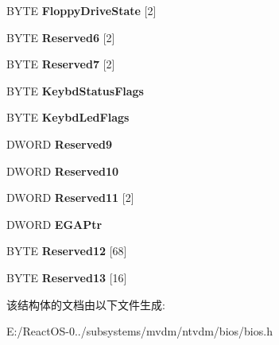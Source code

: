 \begin{DoxyCompactItemize}
B\+Y\+TE {\bfseries Floppy\+Drive\+State} \mbox{[}2\mbox{]}
\item 
\mbox{\label{struct_b_i_o_s___d_a_t_a___a_r_e_a_a6ed4ef6820f5293dbe5fb17b776a8fae}} 
B\+Y\+TE {\bfseries Reserved6} \mbox{[}2\mbox{]}
\item 
\mbox{\label{struct_b_i_o_s___d_a_t_a___a_r_e_a_ad7636bc385d8c009934668ee2b5337d9}} 
B\+Y\+TE {\bfseries Reserved7} \mbox{[}2\mbox{]}
\item 
\mbox{\label{struct_b_i_o_s___d_a_t_a___a_r_e_a_a2111224ba2b309e50cb125a92594e0c5}} 
B\+Y\+TE {\bfseries Keybd\+Status\+Flags}
\item 
\mbox{\label{struct_b_i_o_s___d_a_t_a___a_r_e_a_a73e2c8b470d1cd33cafff1825171b944}} 
B\+Y\+TE {\bfseries Keybd\+Led\+Flags}
\item 
\mbox{\label{struct_b_i_o_s___d_a_t_a___a_r_e_a_ae8f4950d2a4f79ce23a1fe0b0362ef42}} 
D\+W\+O\+RD {\bfseries Reserved9}
\item 
\mbox{\label{struct_b_i_o_s___d_a_t_a___a_r_e_a_af70d764feff7db6720de7bc6b4440c64}} 
D\+W\+O\+RD {\bfseries Reserved10}
\item 
\mbox{\label{struct_b_i_o_s___d_a_t_a___a_r_e_a_a3d8bfe573eea24e7a66ab163b3b0a40e}} 
D\+W\+O\+RD {\bfseries Reserved11} \mbox{[}2\mbox{]}
\item 
\mbox{\label{struct_b_i_o_s___d_a_t_a___a_r_e_a_a192756a71ef4fc193bd886bf2486e1c4}} 
D\+W\+O\+RD {\bfseries E\+G\+A\+Ptr}
\item 
\mbox{\label{struct_b_i_o_s___d_a_t_a___a_r_e_a_a34896cb557eb0fd135e1fe47cf21dc01}} 
B\+Y\+TE {\bfseries Reserved12} \mbox{[}68\mbox{]}
\item 
\mbox{\label{struct_b_i_o_s___d_a_t_a___a_r_e_a_a43cce60ae4a7937c861f7f18a612dc22}} 
B\+Y\+TE {\bfseries Reserved13} \mbox{[}16\mbox{]}
\end{DoxyCompactItemize}


该结构体的文档由以下文件生成\+:\begin{DoxyCompactItemize}
\item 
E\+:/\+React\+O\+S-\/0../subsystems/mvdm/ntvdm/bios/bios.\+h\end{DoxyCompactItemize}
